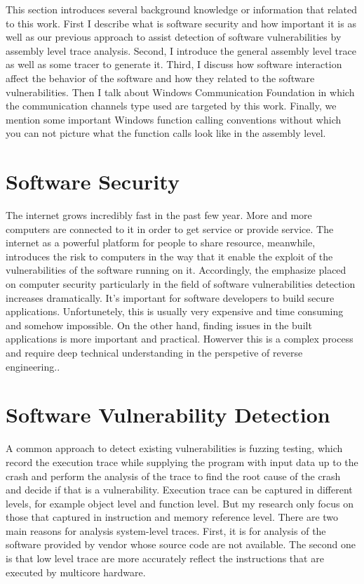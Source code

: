 \label{chapter:Bac}
This section introduces several background knowledge or information that related to this work. First I describe what is software security and how important it is as well as our previous approach to assist detection of software vulnerabilities by assembly level trace analysis. Second, I introduce the general assembly level trace as well as some tracer to generate it. Third, I discuss how software interaction affect the behavior of the software and how they related to the software vulnerabilities. Then I talk about Windows Communication Foundation in which the communication channels type used are targeted by this work. Finally, we mention some important Windows function calling conventions without which you can not picture what the function calls look like in the assembly level.
\section{Software Security}
The internet grows incredibly fast in the past few year. More and more computers are connected to it in order to get service or provide service. The internet as a powerful platform for people to share resource, meanwhile, introduces the risk to computers in the way that it enable the exploit of the vulnerabilities of the software running on it. Accordingly, the emphasize placed on computer security particularly in the field of software vulnerabilities detection increases dramatically. It's important for software developers to build secure applications. Unfortunetely, this is usually very expensive and time consuming and somehow impossible. On the other hand, finding issues in the built applications is more important and practical. Howerver this is a complex process and require deep technical understanding in the perspetive of reverse engineering.\cite{dowd_art_2006}.


\section{Software Vulnerability Detection}
A common approach to detect existing vulnerabilities is fuzzing testing, which record the execution trace while supplying the program with input data up to the crash and perform the analysis of the trace to find the root cause of the crash and decide if that is a vulnerability\cite{cleary_reconstructing_2013}. Execution trace can be captured in different levels, for example object level and function level. But my research only focus on those that captured in instruction and memory reference level. There are two main reasons for analysis system-level traces. First, it is for analysis of the software provided by vendor whose source code are not available. The second one is that low level trace are more accurately reflect the instructions that are executed by multicore hardware\cite{wang_predicting_2011}. 


